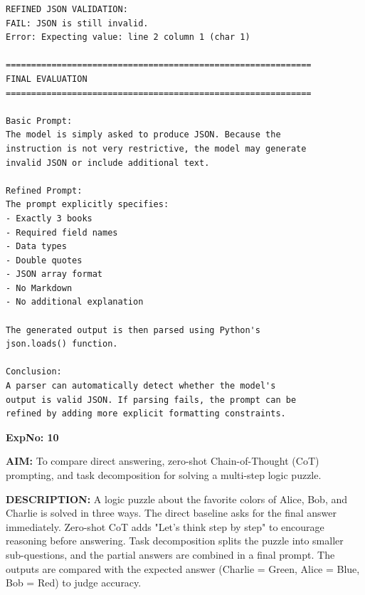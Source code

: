 \documentclass[10pt,a4paper]{article}
\begin{document}
\begin{lstlisting}[style=output]
REFINED JSON VALIDATION:
FAIL: JSON is still invalid.
Error: Expecting value: line 2 column 1 (char 1)

============================================================
FINAL EVALUATION
============================================================

Basic Prompt:
The model is simply asked to produce JSON. Because the
instruction is not very restrictive, the model may generate
invalid JSON or include additional text.

Refined Prompt:
The prompt explicitly specifies:
- Exactly 3 books
- Required field names
- Data types
- Double quotes
- JSON array format
- No Markdown
- No additional explanation

The generated output is then parsed using Python's
json.loads() function.

Conclusion:
A parser can automatically detect whether the model's
output is valid JSON. If parsing fails, the prompt can be
refined by adding more explicit formatting constraints.
\end{lstlisting}


\clearpage

\noindent\textbf{ExpNo: 10}

\noindent\textbf{AIM:} To compare direct answering, zero-shot Chain-of-Thought (CoT) prompting, and task decomposition for solving a multi-step logic puzzle.

\noindent\textbf{DESCRIPTION:} A logic puzzle about the favorite colors of Alice, Bob, and Charlie is solved in three ways. The direct baseline asks for the final answer immediately. Zero-shot CoT adds "Let's think step by step" to encourage reasoning before answering. Task decomposition splits the puzzle into smaller sub-questions, and the partial answers are combined in a final prompt. The outputs are compared with the expected answer (Charlie = Green, Alice = Blue, Bob = Red) to judge accuracy.
\end{document}
